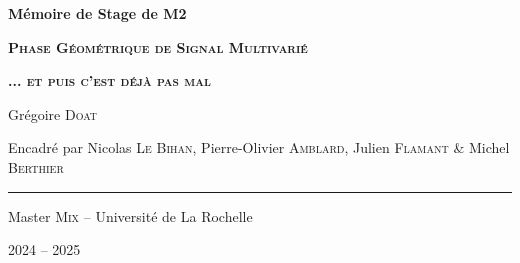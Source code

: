 





	
	


\begin{titlepage}
	
	\centering
	\vspace{1.5cm}
	{\huge\textbf{Mémoire de Stage de M2}}\par
	
	\vspace{2cm}
	{\huge\textbf{\textsc{Phase Géométrique de Signal Multivarié}}}\par 
	\vspace{0.5cm}
	
	{\huge\textbf{\textsc{... et puis c'est déjà pas mal}}}\par
	\vspace{2.0cm}
	
	{\large Grégoire \textsc{Doat}}\par
	\vspace{0.5cm}
	\vfill
	
	{\large Encadré par Nicolas \textsc{Le Bihan}, Pierre-Olivier \textsc{Amblard}, Julien \textsc{Flamant} \& Michel \textsc{Berthier}}\par
	\vspace{0.5cm}
	
	\rule{10cm}{0.4pt}\par
	\vspace{0.7cm}
	
	{Master \textsc{Mix} -- Université de La Rochelle}\par
	\vspace{0.25cm}
	
	{\large 2024 -- 2025}
\end{titlepage}




